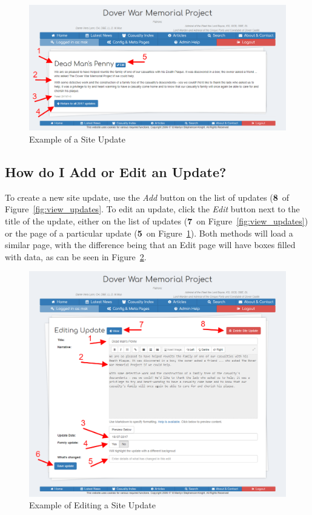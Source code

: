 \documentclass[12pt]{article}
\newcommand{\marker}[1]{\color{red}\textbf{#1}\color{black}}
\begin{document}
\begin{figure}[h]
  \centering
 \includegraphics[width=.9\textwidth]{pics/view_update.png}
	\caption{Example of a Site Update}\label{fig:view_update}
\end{figure}

\newpage
\FloatBarrier
\subsection{How do I Add or Edit an Update?}\label{ssec:edit_update}
To create a new site update, use the \textit{Add} button on the list of updates (\marker{8}\ of Figure~\ref{fig:view_updates}. To edit an update, click the \textit{Edit} button next to the title of the update, either on the list of updates (\marker{7}\ on Figure~\ref{fig:view_updates}) or the page of a particular update (\marker{5}\ on Figure~\ref{fig:view_update}). Both methods will load a similar page, with the difference being that an Edit page will have boxes filled with data, as can be seen in Figure~\ref{fig:edit_update}.

\begin{figure}[h]
  \centering
 \includegraphics[width=.9\textwidth]{pics/edit_update.png}
	\caption{Example of Editing a Site Update}\label{fig:edit_update}
\end{figure}
\end{document}
